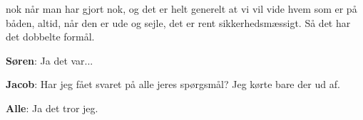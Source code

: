 nok når man har gjort nok, og det er helt generelt at vi vil vide hvem som er på båden, altid, når den er ude og sejle, det er rent sikkerhedsmæssigt. Så det har det dobbelte formål. 

\textbf{Søren}: Ja det var...

\textbf{Jacob}: Har jeg fået svaret på alle jeres spørgsmål? Jeg kørte bare der ud af. 

\textbf{Alle}: Ja det tror jeg.

